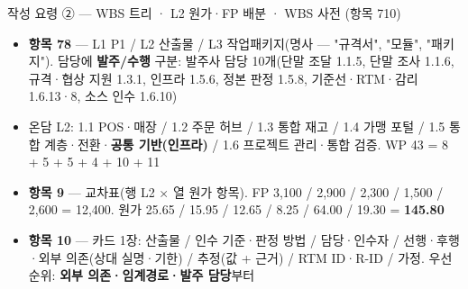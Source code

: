 \begin{frame}{작성 요령 ② — WBS 트리 · L2 원가·FP 배분 · WBS 사전 (항목 7\til{}10)}
\begin{itemize}
\item \textbf{항목 7\til{}8} — L1 P1 / L2 산출물 / L3 작업패키지(명사 — "\til{}규격서", "\til{}모듈", "\til{}패키지"). 담당에 \textbf{발주/수행} 구분: 발주사 담당 10개(단말 조달 1.1.5, 단말 조사 1.1.6, 규격·협상 지원 1.3.1, 인프라 1.5.6, 정본 판정 1.5.8, 기준선·RTM·감리 1.6.1\til{}3·8, 소스 인수 1.6.10)
\item 온담 L2: 1.1 POS·매장 / 1.2 주문 허브 / 1.3 통합 재고 / 1.4 가맹 포털 / 1.5 통합 계층·전환·\textbf{공통 기반(인프라)} / 1.6 프로젝트 관리·통합 검증. WP 43 = 8 + 5 + 5 + 4 + 10 + 11
\item \textbf{항목 9} — 교차표(행 L2 × 열 원가 항목). FP 3,100 / 2,900 / 2,300 / 1,500 / 2,600 = 12,400. 원가 25.65 / 15.95 / 12.65 / 8.25 / 64.00 / 19.30 = \textbf{145.80}
\item \textbf{항목 10} — 카드 1장: 산출물 / 인수 기준·판정 방법 / 담당·인수자 / 선행·후행·외부 의존(상대 실명·기한) / 추정(값 + 근거) / RTM ID·R-ID / 가정. 우선순위: \textbf{외부 의존·임계경로·발주 담당}부터
\end{itemize}
\end{frame}

